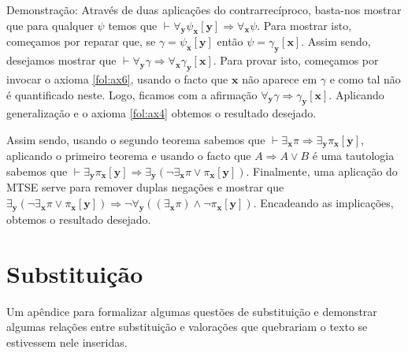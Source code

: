 \documentclass{report}
\theoremstyle{definition}
\theoremstyle{remark}
\renewcommand{\bf}[1]{\mathbf{#1}}
\newcommand{\imply}{\mathbin{\Rightarrow}}
\begin{document}
\begin{itemize}
\begin{itemize}
	Demonstração: Através de duas aplicações do contrarrecíproco, basta-nos mostrar que para qualquer $\psi$ temos que $\vdash \forall_{\bf y} \psi_{\bf x}[\bf y] \imply \forall_{\bf x} \psi$. Para mostrar isto, começamos por reparar que, se $\gamma = \psi_{\bf x}[\bf y]$ então $\psi = \gamma_{\bf y}[\bf x]$. Assim sendo, desejamos mostrar que $\vdash \forall_{\bf y} \gamma \imply \forall_{\bf x} \gamma_{\bf y}[\bf x]$. Para provar isto, começamos por invocar o axioma \eqref{fol:ax6}, usando o facto que $\bf x$ não aparece em $\gamma$ e como tal não é quantificado neste. Logo, ficamos com a afirmação $\forall_{\bf y} \gamma \imply \gamma_{\bf y}[\bf x]$. Aplicando generalização e o axioma \eqref{fol:ax4} obtemos o resultado desejado.
	\end{itemize}

	Assim sendo, usando o segundo teorema sabemos que $\vdash \exists_{\bf x} \pi \imply \exists_{\bf y} \pi_{\bf x}[\bf y]$, aplicando o primeiro teorema e usando  o facto que $A \imply A \lor B$ é uma tautologia sabemos que $\vdash \exists_{\bf y} \pi_{\bf x}[\bf y] \imply \exists_{\bf y} (\neg \exists_{\bf x} \pi \lor \pi_{\bf x}[\bf y])$. Finalmente, uma aplicação do MTSE serve para remover duplas negações e mostrar que $\exists_{\bf y} (\neg \exists_{\bf x} \pi \lor \pi_{\bf x}[\bf y]) \imply \neg \forall_{\bf y} ( (\exists_{\bf x} \pi) \land \neg \pi_{\bf x}[\bf y])$. Encadeando as implicações, obtemos o resultado desejado.

	\end{itemize}

	\appendix

	\chapter{Substituição}

	Um apêndice para formalizar algumas questões de substituição e demonstrar algumas relações entre substituição e valorações que quebrariam o texto se estivessem nele inseridas.
	
	\nocite{fltc}
	\nocite{shoenfield}
	
	
	
\end{document}

